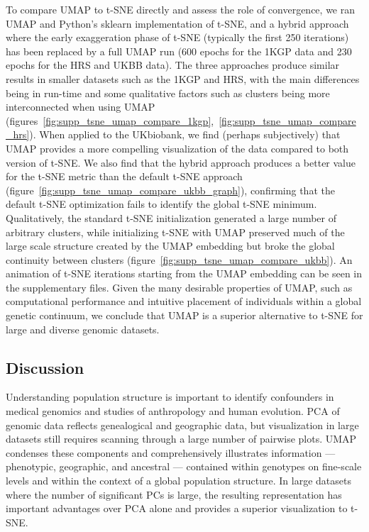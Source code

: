 \documentclass[12pt]{pnas-new}
\begin{document}
To compare UMAP to t-SNE directly and assess the role of convergence, we ran UMAP and Python's sklearn implementation of t-SNE, and a hybrid approach where the early exaggeration phase of t-SNE (typically the first 250 iterations) has been replaced by a full UMAP run (600 epochs for the 1KGP data and 230 epochs for the HRS and UKBB data). The three approaches produce similar results in smaller datasets such as the 1KGP and HRS, with the main differences being in run-time and some qualitative factors such as clusters being more interconnected when using UMAP (figures~\ref{fig:supp_tsne_umap_compare_1kgp},~\ref{fig:supp_tsne_umap_compare_hrs}). When applied to the UKbiobank, we find (perhaps subjectively) that UMAP provides a more compelling visualization of the data compared to both version of t-SNE. We also find that the hybrid approach produces a better value for the t-SNE metric than the default t-SNE approach (figure~\ref{fig:supp_tsne_umap_compare_ukbb_graph}), confirming that the default t-SNE optimization fails to identify the global t-SNE minimum. Qualitatively, the standard t-SNE initialization generated a large number of arbitrary clusters, while initializing t-SNE with UMAP preserved much of the large scale structure created by the UMAP embedding but broke the global continuity between clusters (figure~\ref{fig:supp_tsne_umap_compare_ukbb}). An animation of t-SNE iterations starting from the UMAP embedding can be seen in the supplementary files. Given the many desirable properties of UMAP, such as computational performance and intuitive placement of individuals within a global genetic continuum, we conclude that UMAP is a superior alternative to t-SNE for large and diverse genomic datasets.

\subsection*{Discussion}
Understanding population structure is important to identify confounders in medical genomics and studies of anthropology and human evolution. PCA of genomic data reflects genealogical and geographic data, but visualization in large datasets still requires scanning through a large number of pairwise plots. UMAP condenses these components and comprehensively illustrates information --- phenotypic, geographic, and ancestral --- contained within genotypes on fine-scale levels and within the context of a global population structure. In large datasets where the number of significant PCs is large, the resulting representation has important advantages over
PCA alone and provides a superior visualization to t-SNE.
\end{document}

